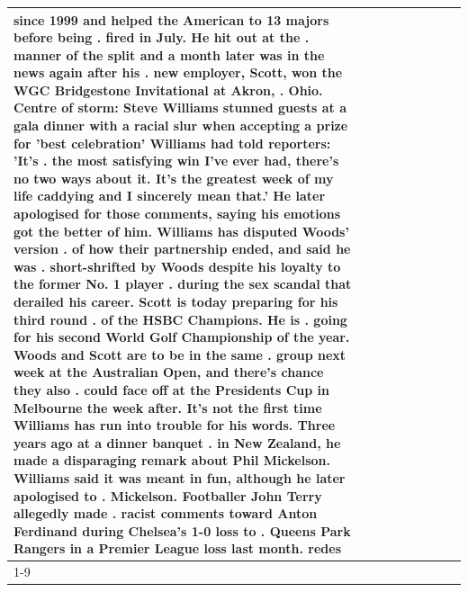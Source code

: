 \begin{table}[H]
\begin{tabular}{lllrlllll}
since 1999 and helped the American to 13 majors before being . fired in July. He hit out at the . manner of the split and a month later was in the news again after his . new employer, Scott, won the WGC Bridgestone Invitational at Akron, . Ohio. Centre of storm: Steve Williams stunned guests at a gala dinner with a racial slur when accepting a prize for 'best celebration' Williams had told reporters: 'It's . the most satisfying win I've ever had, there's no two ways about it. It's the greatest week of my life caddying and I sincerely mean that.' He later apologised for those comments, saying his emotions got the better of him. Williams has disputed Woods' version . of how their partnership ended, and said he was . short-shrifted by Woods despite his loyalty to the former No. 1 player . during the sex scandal that derailed his career. Scott is today preparing for his third round . of the HSBC Champions. He is . going for his second World Golf Championship of the year. Woods and Scott are to be in the same . group next week at the Australian Open, and there's chance they also . could face off at the Presidents Cup in Melbourne the week after. It's not the first time Williams has run into trouble for his words. Three years ago at a dinner banquet . in New Zealand, he made a disparaging remark about Phil Mickelson. Williams said it was meant in fun, although he later apologised to . Mickelson. Footballer John Terry allegedly made . racist comments toward Anton Ferdinand during Chelsea's 1-0 loss to . Queens Park Rangers in a Premier League loss last month. redes \\
\cline{1-9}

\end{tabular}
\end{table}
